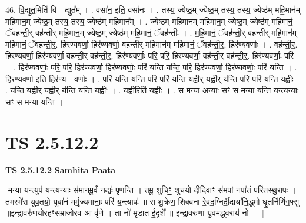 \documentclass[17pt]{extarticle}
\begin{document}
46. वि॒द्युत॒मिति॑ वि - द्युत᳚म् । . वसा॑न॒ इति॒ वसा॑नः । . तस्य॒ ज्येष्ठ॒म् ज्येष्ठ॒म् तस्य॒ तस्य॒ ज्येष्ठ॑म् महि॒मान॑म् महि॒मान॒म् ज्येष्ठ॒म् तस्य॒ तस्य॒ ज्येष्ठ॑म् महि॒मान᳚म् । . ज्येष्ठ॑म् महि॒मान॑म् महि॒मान॒म् ज्येष्ठ॒म् ज्येष्ठ॑म् महि॒मानं॒ ॅवह॑न्ती॒र् वह॑न्तीर् महि॒मान॒म् ज्येष्ठ॒म् ज्येष्ठ॑म् महि॒मानं॒ ॅवह॑न्तीः । . म॒हि॒मानं॒ ॅवह॑न्ती॒र् वह॑न्तीर् महि॒मान॑म् महि॒मानं॒ ॅवह॑न्ती॒र्॒. हिर॑ण्यवर्णा॒ हिर॑ण्यवर्णा॒ वह॑न्तीर् महि॒मान॑म् महि॒मानं॒ ॅवह॑न्ती॒र्॒. हिर॑ण्यवर्णाः । . वह॑न्ती॒र्॒. हिर॑ण्यवर्णा॒ हिर॑ण्यवर्णा॒ वह॑न्ती॒र् वह॑न्ती॒र्॒. हिर॑ण्यवर्णाः॒ परि॒ परि॒ हिर॑ण्यवर्णा॒ वह॑न्ती॒र् वह॑न्ती॒र्॒. हिर॑ण्यवर्णाः॒ परि॑ । . हिर॑ण्यवर्णाः॒ परि॒ परि॒ हिर॑ण्यवर्णा॒ हिर॑ण्यवर्णाः॒ परि॑ यन्ति यन्ति॒ परि॒ हिर॑ण्यवर्णा॒ हिर॑ण्यवर्णाः॒ परि॑ यन्ति । . हिर॑ण्यवर्णा॒ इति॒ हिर॑ण्य - व॒र्णाः॒ । . परि॑ यन्ति यन्ति॒ परि॒ परि॑ यन्ति य॒ह्वीर् य॒ह्वीर् य॑न्ति॒ परि॒ परि॑ यन्ति य॒ह्वीः । . य॒न्ति॒ य॒ह्वीर् य॒ह्वीर् य॑न्ति यन्ति य॒ह्वीः । . य॒ह्वीरिति॑ य॒ह्वीः । . स म॒न्या अ॒न्याः सꣳ स म॒न्या यन्ति॒ यन्त्य॒न्याः सꣳ स म॒न्या यन्ति॑ । \newline
\pagebreak
{}

\section{ TS 2.5.12.2 }

\textbf{TS 2.5.12.2 } \newline
\textbf{Samhita Paata} \newline

-म॒न्या यन्त्युप॑ यन्त्य॒न्याः स॑मा॒नमू॒र्वं न॒द्यः॑ पृणन्ति । तमू॒ शुचिꣳ॒॒ शुच॑यो दीदि॒वाꣳ स॑म॒पां नपा॑तं॒ परि॑तस्थु॒रापः॑ । तमस्मे॑रा युव॒तयो॒ युवा॑नं मर्मृ॒ज्यमा॑नाः॒ परि॑ य॒न्त्यापः॑ ॥ स शु॒क्रेण॒ शिक्व॑ना रे॒वद॒ग्निर्दी॒दाया॑नि॒द्ध्मो घृ॒तनि॑र्णिग॒फ्सु ॥इन्द्रा॒वरु॑णयोर॒हꣳस॒म्राजो॒रव॒ आ वृ॑णे । ता नो॑ मृडात ई॒दृशे᳚ ॥ इन्द्रा॑वरुणा यु॒वम॑द्ध्व॒राय॑ नो - [  ] \newline
\end{document}
